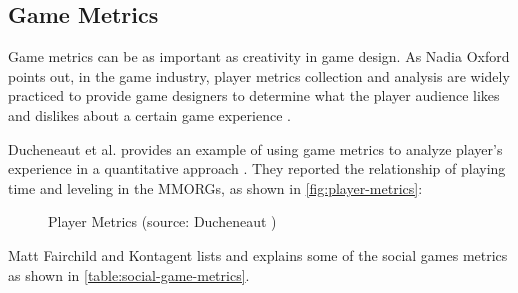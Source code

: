\subsection{Game Metrics}

Game metrics can be as important as creativity in game design. As Nadia Oxford points out, in the game industry, player metrics collection and analysis are widely practiced to provide game designers to determine what the player audience likes and dislikes about a certain game experience \cite {Oxford2010}. 

Ducheneaut et al. provides an example of 
using game metrics to analyze player's experience in a quantitative approach \cite {ducheneaut2006alone}. They reported the relationship of playing time and leveling in the MMORGs, as shown in \autoref{fig:player-metrics}:

\begin{figure}[ht!]
	\centering
		\caption{Player Metrics (source: Ducheneaut \cite{ducheneaut2006alone})}
		\label{fig:player-metrics}
\end{figure}

Matt Fairchild \cite {Fairchild2010} and Kontagent \cite {Kontagent2010} lists and explains some of the social games metrics as shown in \autoref{table:social-game-metrics}.

